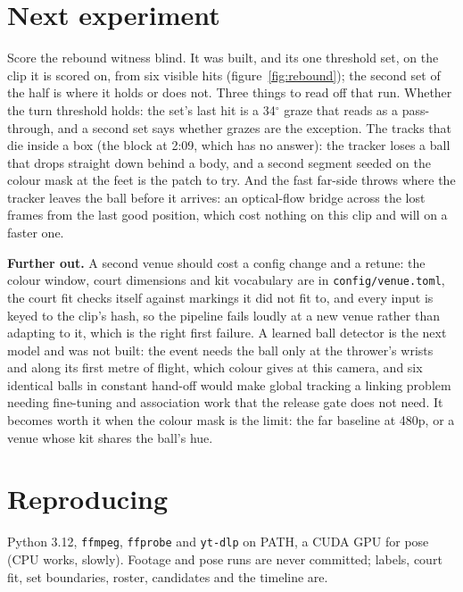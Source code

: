 \documentclass[10pt,a4paper]{article}
\begin{document}
\section{Next experiment}
\label{sec:next}

Score the rebound witness blind. It was built, and its one threshold set, on the clip it
is scored on, from six visible hits (figure~\ref{fig:rebound}); the second set of the half
is where it holds or does not. Three things to read off that run. Whether the turn
threshold holds: the set's last hit is a 34$^\circ$ graze that reads as a pass-through, and
a second set says whether grazes are the exception. The tracks that die inside a box (the
block at 2:09, which has no answer): the tracker loses a ball that drops straight down behind
a body, and a second segment seeded on the colour mask at the feet is the patch to try. And
the fast far-side throws where the tracker leaves the ball before it arrives: an optical-flow
bridge across the lost frames from the last good position, which cost nothing on this clip
and will on a faster one.

\textbf{Further out.} A second venue should cost a config change and a retune: the
colour window, court dimensions and kit vocabulary are in \texttt{config/venue.toml}, the
court fit checks itself against markings it did not fit to, and every input is keyed to the
clip's hash, so the pipeline fails loudly at a new venue rather than adapting to it, which is
the right first failure. A learned ball detector is the next model and was not
built: the event needs the ball only at the thrower's wrists and along its first metre of
flight, which colour gives at this camera, and six identical balls in constant hand-off
would make global tracking a linking problem needing fine-tuning and association work that
the release gate does not need. It becomes worth it when the colour mask is the limit: the
far baseline at 480p, or a venue whose kit shares the ball's hue.

\section{Reproducing}
\label{sec:repro}

Python 3.12, \texttt{ffmpeg}, \texttt{ffprobe} and \texttt{yt-dlp} on PATH, a CUDA GPU
for pose (CPU works, slowly). Footage and pose runs are never committed; labels, court fit,
set boundaries, roster, candidates and the timeline are.
\end{document}
